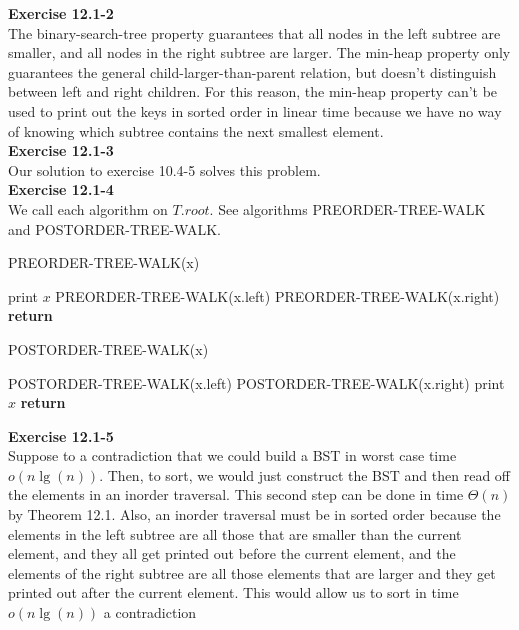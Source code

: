 \documentclass{article}
\begin{document}
\noindent\textbf{Exercise 12.1-2}\\

The binary-search-tree property guarantees that all nodes in the left subtree are smaller, and all nodes in the right subtree are larger. The min-heap property only guarantees the general child-larger-than-parent relation, but doesn't distinguish between left and right children.  For this reason, the min-heap property can't be used to print out the keys in sorted order in linear time because we have no way of knowing which subtree contains the next smallest element. \\

\noindent\textbf{ Exercise 12.1-3} \\

Our solution to exercise 10.4-5 solves this problem.\\

\noindent\textbf{Exercise 12.1-4}\\

We call each algorithm on $T.root$. See algorithms PREORDER-TREE-WALK and POSTORDER-TREE-WALK.\\
\begin{algorithm}
\caption{PREORDER-TREE-WALK(x)}
\begin{algorithmic}
	\State print $x$
	\State PREORDER-TREE-WALK(x.left)
	\State PREORDER-TREE-WALK(x.right)
\EndIf
\State \textbf{return}
\end{algorithmic}
\end{algorithm}

\begin{algorithm}
\caption{POSTORDER-TREE-WALK(x)}
\begin{algorithmic}
	\State POSTORDER-TREE-WALK(x.left)
	\State POSTORDER-TREE-WALK(x.right)
	\State print $x$
\EndIf
\State \textbf{return}
\end{algorithmic}
\end{algorithm}


\noindent\textbf{ Exercise 12.1-5} \\


Suppose to a contradiction that we could build a BST in worst case time $o(n\lg(n))$. Then, to sort, we would just construct the BST and then read off the elements in an inorder traversal. This second step can be done in time $\Theta(n)$ by Theorem 12.1. Also, an inorder traversal must be in sorted order because the elements in the left subtree are all those that are smaller than the current element, and they all get printed out before the current element, and the elements of the right subtree are all those elements that are larger and they get printed out  after the current element. This would allow us to sort in time $o(n\lg(n))$ a contradiction\\
\end{document}
